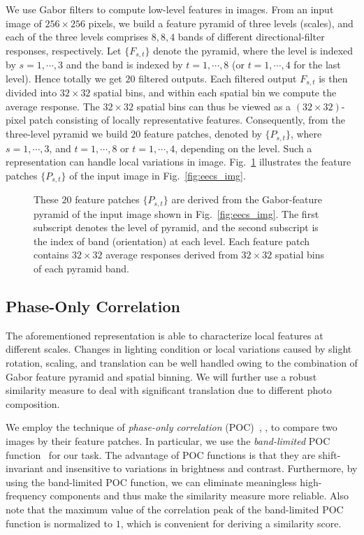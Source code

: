 \documentclass[conference]{IEEEtran}
\begin{document}
We use Gabor filters to compute low-level features in images. From an input image of $256\times 256$ pixels, we build a feature pyramid of three levels (scales), and each of the three levels comprises $8, 8, 4$ bands of different directional-filter responses, respectively. Let $\{F_{s,t}\}$ denote the pyramid, where the level is indexed by $s=1,\cdots,3$ and the band is indexed by $t=1,\cdots,8$ (or $t=1,\cdots,4$ for the last level). Hence totally we get $20$ filtered outputs. Each filtered output $F_{s,t}$ is then divided into $32\times 32$ spatial bins, and within each spatial bin we compute the average response. The $32\times 32$ spatial bins can thus be viewed as a $(32\times 32)$-pixel patch consisting of locally representative features. Consequently, from the three-level pyramid we build $20$ feature patches, denoted by $\{P_{s,t}\}$, where $s=1,\cdots,3$, and $t=1,\cdots,8$ or $t=1,\cdots,4$, depending on the level. Such a representation can handle local variations in image. 
Fig.~\ref{fig:eecs_gabor} illustrates the feature patches $\{P_{s,t}\}$ of the input image in Fig.~\ref{fig:eecs_img}.


\begin{figure}
\centering
{}
\caption{These $20$ feature patches $\{P_{s,t}\}$ are derived from the Gabor-feature pyramid of the input image shown in Fig.~\ref{fig:eecs_img}. The first subscript denotes the level of pyramid, and the second subscript is the index of band (orientation) at each level. Each feature patch contains $32\times 32$ average responses derived from $32\times 32$ spatial bins of each pyramid band. }
\label{fig:eecs_gabor}
\end{figure}


\subsection{Phase-Only Correlation}

The aforementioned representation is able to characterize local features at different scales. Changes in lighting condition or local variations caused by slight rotation, scaling, and translation can be well handled owing to the combination of Gabor feature pyramid and spatial binning. We will further use a robust similarity measure to deal with significant translation due to different photo composition.

We employ the technique of {\em phase-only correlation} (POC)~\cite{ItoNKAH04}, \cite{ItoNAKKK08}, \cite{MiyazawaIAKN08} to compare two images by their feature patches. In particular, we use the {\em band-limited} POC function~\cite{ItoNKAH04} for our task. The advantage of POC functions is that they are shift-invariant and insensitive to variations in brightness and contrast. Furthermore, by using the band-limited POC function, we can eliminate meaningless high-frequency components and thus make the similarity measure more reliable. Also note that the maximum value of the correlation peak of the band-limited POC function is normalized to $1$, which is convenient for deriving a similarity score.
\end{document}
